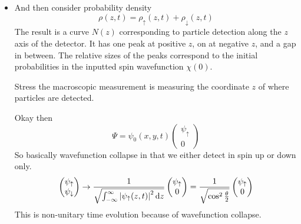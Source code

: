 \documentclass[11pt, a4paper]{article}
\newcommand{\diff}{\mathop{}\!\mathrm{d}} %
\newcommand{\ua}{\uparrow}  %
\newcommand{\da}{\downarrow}  %
\begin{document}
\begin{itemize}
    \item And then consider probability density
    \begin{equation*}
        \rho(z, t) = \rho_{\ua}(z, t) + \rho_{\da}(z, t)
    \end{equation*}
    The result is a curve $ N(z) $ corresponding to particle detection along the $ z $ axis of the detector. It has one peak at positive $ z $, on at negative $ z $, and a gap in between. The relative sizes of the peaks correspond to the initial probabilities in the inputted spin wavefunction $ \chi(0) $.
    
    Stress the macroscopic measurement is measuring the coordinate $ z $ of where particles are detected. 

    Okay then
    \begin{equation*}
        \Psi = \psi_{0}(x, y, t)
        \begin{pmatrix}
            \psi_{\ua}\\
            0
        \end{pmatrix}
    \end{equation*}
    So basically wavefunction collapse in that we either detect in spin up or down only. 
    \begin{equation*}
        \begin{pmatrix}
            \psi_{\ua}\\
            \psi_{\da}
        \end{pmatrix}
        \to 
        \frac{1}{\sqrt{\int_{-\infty}^{\infty} \abs{\psi_{\ua} (z, t)}^{2}\diff z}}
        \begin{pmatrix}
            \psi_{\ua}\\
            0
        \end{pmatrix}
        = \frac{1}{\sqrt{\cos^{2}\frac{\theta}{2}}}
        \begin{pmatrix}
            \psi_{\ua}\\
            0
        \end{pmatrix}
    \end{equation*}
    This is non-unitary time evolution because of wavefunction collapse. 
    
\end{itemize}
\fi
\end{document}
